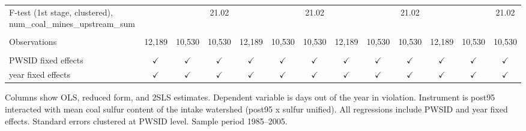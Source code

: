 \begin{table}[htbp]
\begin{adjustbox}{width = \textwidth, center}
\begin{tabular}{lcccccccccccc}
         F-test (1st stage, clustered), num\_coal\_mines\_upstream\_sum     &               &               & 21.02         &               &               & 21.02         &               &               & 21.02         &               &               & 21.02\\  
         
          \\
         
         Observations                                                       & 12,189        & 10,530        & 10,530        & 12,189        & 10,530        & 10,530        & 12,189        & 10,530        & 10,530        & 12,189        & 10,530        & 10,530\\  
         
          \\
         
         PWSID fixed effects                                                & $\checkmark$  & $\checkmark$  & $\checkmark$  & $\checkmark$  & $\checkmark$  & $\checkmark$  & $\checkmark$  & $\checkmark$  & $\checkmark$  & $\checkmark$  & $\checkmark$  & $\checkmark$\\   
         year fixed effects                                                 & $\checkmark$  & $\checkmark$  & $\checkmark$  & $\checkmark$  & $\checkmark$  & $\checkmark$  & $\checkmark$  & $\checkmark$  & $\checkmark$  & $\checkmark$  & $\checkmark$  & $\checkmark$\\   
         
         \bottomrule
         
      \end{tabular}
      
      
      
   \end{adjustbox}
      {\tiny\linespread{1}\selectfont \par \raggedright 
   Columns show OLS, reduced form, and 2SLS estimates. Dependent variable is days out of the year in violation. Instrument is post95 interacted with mean coal sulfur content of the intake watershed (post95 x sulfur unified). All regressions include PWSID and year fixed effects. Standard errors clustered at PWSID level. Sample period 1985--2005.}
   
\end{table}


